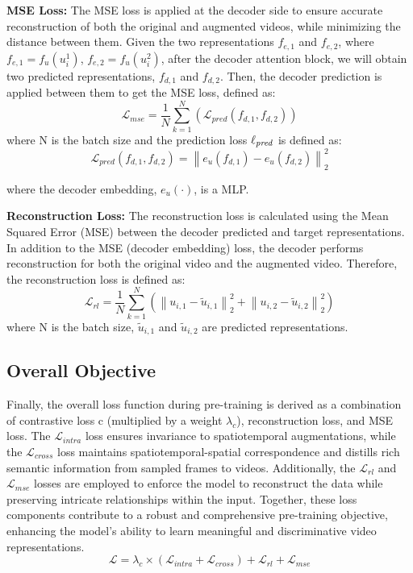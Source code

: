 \noindent \textbf{MSE Loss:} The MSE loss is applied at the decoder side to ensure accurate reconstruction of both the original and augmented videos, while minimizing the distance between them. Given the two representations \(f_{e, 1}\) and \(f_{e, 2}\), where \(f_{e, 1} = f_{u}(u_i^{1})\), \(f_{e, 2} = f_{u}(u_i^{2})\), after the decoder attention block, we will obtain two predicted representations, \(f_{d, 1}\) and \(f_{d, 2}\). Then, the decoder prediction is applied between them to get the MSE loss, defined as:
\begin{equation}
\mathcal{L}_{mse} = \frac{1}{N} \sum_{k=1}^{N} (\mathcal{L}_{\textit{pred}}(f_{d, 1}, f_{d, 2}))
\end{equation}
\noindent where N is the batch size and the prediction loss $\ell_{\text{\textit{pred}}}$ is defined as:
\begin{equation}
\mathcal{L}_{\textit{pred}}(f_{d, 1}, f_{d, 2}) = \left\| e_{u}(f_{d, 1}) - e_{u}(f_{d, 2}) \right\|_2^2
\end{equation}

\noindent where the decoder embedding, \(e_{u}(\cdot)\), is a MLP. 

\noindent \textbf{Reconstruction Loss:} The reconstruction loss is calculated using the Mean Squared Error (MSE) between the decoder predicted and target representations. In addition to the MSE (decoder embedding) loss, the decoder performs reconstruction for both the original video and the augmented video. Therefore, the reconstruction loss is defined as:
\begin{equation}
\mathcal{L}_{rl} = \frac{1}{N} \sum_{k=1}^{N} (\left\| u_{i, 1} - \tilde{u}_{i, 1} \right\|_2^2 + \left\| u_{i, 2} - \tilde{u}_{i, 2} \right\|_2^2)
\end{equation}
where N is the batch size, $\tilde{u}_{i, 1}$ and $\tilde{u}_{i, 2}$ are predicted representations.

\subsection{Overall Objective}
\label{sec:objective}

Finally, the overall loss function during pre-training is derived as a combination of contrastive loss c (multiplied by a weight $\lambda_c$), reconstruction loss, and MSE loss. The \(\mathcal{L}_{intra}\) loss ensures invariance to spatiotemporal augmentations, while the \(\mathcal{L}_{cross}\) loss maintains spatiotemporal-spatial correspondence and distills rich semantic information from sampled frames to videos. Additionally, the \(\mathcal{L}_{rl}\) and \(\mathcal{L}_{mse}\) losses are employed to enforce the model to reconstruct the data while preserving intricate relationships within the input. Together, these loss components contribute to a robust and comprehensive pre-training objective, enhancing the model's ability to learn meaningful and discriminative video representations.
\vspace{-5pt}
\begin{equation}
\mathcal{L} = \lambda_c \times (\mathcal{L}_{intra} + \mathcal{L}_{cross}) + \mathcal{L}_{rl} + \mathcal{L}_{mse} 
\end{equation}
\vspace{-5pt}

